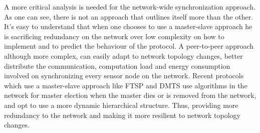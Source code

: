 A more critical analysis is needed for the network-wide synchronization approach. As one can see, there is not an approach
that outlines itself more than the other. It's easy to understand that when one chooses to use a master-slave approach he is sacrificing redundancy on the network over low complexity on how to implement and to predict the behaviour of the protocol. A peer-to-peer approach although more complex, can easily adapt to network topology changes, better distribute the communication, computation load and energy consumption involved on synchronizing every sensor node on the network. Recent protocols which use a master-slave approach like FTSP and DMTS use algorithms in the network for master election when the master dies or is removed from the network, and opt to use a more dynamic hierarchical structure. Thus, providing more redundancy to the network and making it more resilient to network topology changes.

